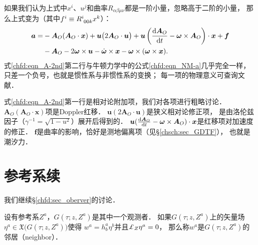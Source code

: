 如果我们认为上式中$x^i$、$u^j$和曲率$R_{\alpha\beta\mu\nu}$都是一阶小量，忽略高于二阶的小量，
那么上式变为（其中$f^i \equiv R_{\hphantom{i}00k}^i x^k$）：
\begin{equation}\label{chfd:eqn_A-2nd}
    \begin{aligned}
  \boldsymbol{a}=&  - \boldsymbol{A}_{O} ( \boldsymbol{A}_{O}\cdot \boldsymbol{x}) 
  +\boldsymbol{u} \bigl( 2  \boldsymbol{A}_{O} \cdot \boldsymbol{u} \bigr) 
    +\boldsymbol{u} \left(\frac{{\rm d}\boldsymbol{A}_{O}}{{\rm d}t}
    -\boldsymbol{\omega}\times \boldsymbol{A}_{O}  \right) \cdot \boldsymbol{x}
     + \boldsymbol{f} \\
    & - \boldsymbol{A}_{O}   -2 \boldsymbol{\omega}\times \boldsymbol{u}
         - \dot{\boldsymbol{\omega}}\times \boldsymbol{x}
         - \boldsymbol{\omega}\times (\boldsymbol{\omega}\times \boldsymbol{x}) .
    \end{aligned}
\end{equation}
式\eqref{chfd:eqn_A-2nd}第二行与牛顿力学中的公式\eqref{chfd:eqn_NM-a}几乎完全一样，
只差一个负号，也就是惯性系与非惯性系的变换；
每一项的物理意义可查询文献\parencite[\S 3.6]{zhuzx-zy-vI}．

式\eqref{chfd:eqn_A-2nd}第一行是相对论附加项，我们对各项进行粗略讨论．
$\boldsymbol{A}_{O} ( \boldsymbol{A}_{O}\cdot \boldsymbol{x})$项是Doppler红移．
$\boldsymbol{u} ( 2  \boldsymbol{A}_{O} \cdot \boldsymbol{u} )$是狭义相对论修正项，
是由洛伦兹因子（$\gamma^{-1}=\sqrt{1-u^2}$）展开后得到的．
$\boldsymbol{u} (\frac{{\rm d}\boldsymbol{A}_{O}}{{\rm d}t}
-\boldsymbol{\omega}\times \boldsymbol{A}_{O}  ) \cdot \boldsymbol{x}$是红移项对加速度的修正．
$\boldsymbol{f}$是曲率的影响，恰好是测地偏离项（见\S\ref{chsch:sec_GDTF}），
也就是{\kaishu 潮汐力}．











\section{参考系续}\label{chfd:sec_reference-frame}

我们继续\S\ref{chfd:sec_oberver}的讨论．

\begin{definition}\label{chfd:def_neighbor}
    设有参考系$Z^a$，$G(\tau;z,Z^a)$是其中一个观测者．
    如果$G(\tau;z,Z^a)$上的矢量场$\eta^a \in \mathfrak{X}
    \bigl(G(\tau;z,Z^a)\bigr)$使得
    $w^a=h^a_b \eta^b$并且$\Lie_{Z}\eta^a =0$，
    那么称$w^a$是$G(\tau;z,Z^a)$的{\heiti 邻居}（neighbor）．
\end{definition}

